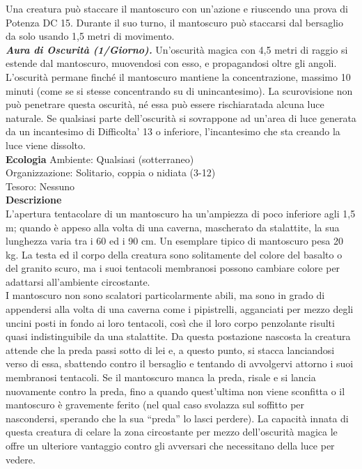 \begin{multicols}{2}
Una creatura può staccare il mantoscuro con un'azione e riuscendo una prova di Potenza DC  15. Durante il suo turno, il mantoscuro può staccarsi dal bersaglio da solo usando 1,5 metri di movimento.\\
\emph{\textbf{Aura di Oscurità (1/Giorno).}} Un'oscurità magica con 4,5 metri di raggio si estende dal mantoscuro, muovendosi con esso, e propagandosi oltre gli angoli. L'oscurità permane finché il mantoscuro mantiene la concentrazione, massimo 10 minuti (come se si stesse concentrando su di unincantesimo). La scurovisione non può penetrare  questa oscurità, né essa può essere rischiaratada alcuna luce naturale. Se qualsiasi parte dell'oscurità si sovrappone ad un'area di  luce generata da un incantesimo di Difficolta' 13 o inferiore, l'incantesimo che sta creando la luce viene dissolto.\\
\textbf{Ecologia}
Ambiente: Qualsiasi (sotterraneo)\\
Organizzazione: Solitario, coppia o nidiata (3-12)\\
Tesoro: Nessuno\\
\textbf{Descrizione}\\
L’apertura tentacolare di un mantoscuro ha un’ampiezza di poco inferiore agli 1,5 m; quando è appeso alla volta di una caverna, mascherato da stalattite, la sua lunghezza varia tra i 60 ed i 90 cm. Un esemplare tipico di mantoscuro pesa 20 kg. La testa ed il corpo della creatura sono solitamente del colore del basalto o del granito scuro, ma i suoi tentacoli membranosi possono cambiare colore per adattarsi all’ambiente circostante.\\

I mantoscuro non sono scalatori particolarmente abili, ma sono in grado di appendersi alla volta di una caverna come i pipistrelli, agganciati per mezzo degli uncini posti in fondo ai loro tentacoli, così che il loro corpo penzolante risulti quasi indistinguibile da una stalattite. Da questa postazione nascosta la creatura attende che la preda passi sotto di lei e, a questo punto, si stacca lanciandosi verso di essa, sbattendo contro il bersaglio e tentando di avvolgervi attorno i suoi membranosi tentacoli. Se il mantoscuro manca la preda, risale e si lancia nuovamente contro la preda, fino a quando quest’ultima non viene sconfitta o il mantoscuro è gravemente ferito (nel qual caso svolazza sul soffitto per nascondersi, sperando che la sua “preda” lo lasci perdere). La capacità innata di questa creatura di celare la zona circostante per mezzo dell’oscurità magica le offre un ulteriore vantaggio contro gli avversari che necessitano della luce per vedere.\\


\end{multicols}
